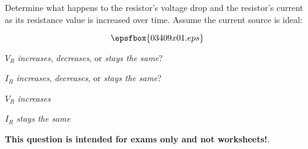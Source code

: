 

Determine what happens to the resistor's voltage drop and the resistor's current as its resistance value is increased over time.  Assume the current source is ideal:

$$\epsfbox{03409x01.eps}$$

$V_R$ {\it increases}, {\it decreases}, or {\it stays the same}?

\vskip 10pt

$I_R$ {\it increases}, {\it decreases}, or {\it stays the same}?







$V_R$ {\it increases}

\vskip 10pt

$I_R$ {\it stays the same}







{\bf This question is intended for exams only and not worksheets!}.



